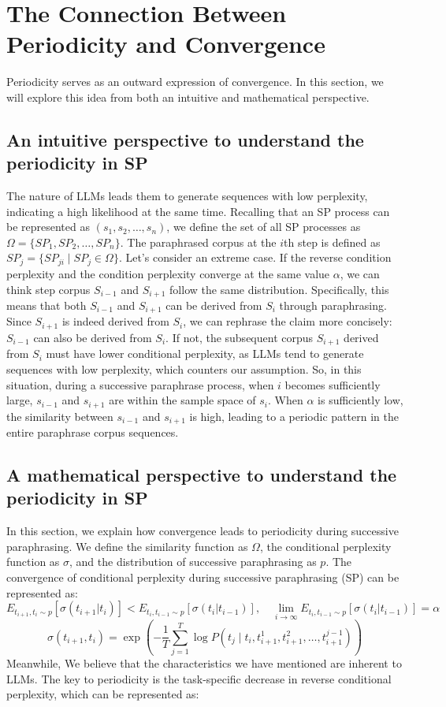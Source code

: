 \section{The Connection Between Periodicity and Convergence}
Periodicity serves as an outward expression of convergence.
In this section, we will explore this idea from both an intuitive and mathematical perspective.
\label{Convergences2Periodicity}
\subsection{An intuitive perspective to understand the periodicity in SP}
The nature of LLMs leads them to generate sequences with low perplexity, indicating a high likelihood at the same time.
Recalling that an SP process can be represented as \((s_1, s_2, \dots, s_n)\), we define the set of all SP processes as \(\Omega = \{SP_1, SP_2, \dots, SP_n\}\). The paraphrased corpus at the \(i\)th step is defined as \(SP_j = \{SP_{ji} \mid SP_j \in \Omega\}\).
Let's consider an extreme case.
If the reverse condition perplexity and the condition perplexity converge at the same value \(\alpha\), we can think step corpus \(S_{i-1}\) and \(S_{i+1}\) follow the same distribution.
Specifically, this means that both \(S_{i-1}\) and \(S_{i+1}\) can be derived from \(S_i\) through paraphrasing. 
Since \(S_{i+1}\) is indeed derived from \(S_i\), we can rephrase the claim more concisely: \(S_{i-1}\) can also be derived from \(S_i\). 
If not, the subsequent corpus \(S_{i+1}\) derived from \(S_i\) must have lower conditional perplexity, as LLMs tend to generate sequences with low perplexity, which counters our assumption.
So, in this situation, during a successive paraphrase process, when \(i\) becomes sufficiently large, \(s_{i-1}\) and \(s_{i+1}\) are within the sample space of \(s_i\).
When \(\alpha\) is sufficiently low, the similarity between \(s_{i-1}\) and \(s_{i+1}\) is high, leading to a periodic pattern in the entire paraphrase corpus sequences.

\subsection{A mathematical perspective to understand the periodicity in SP}

In this section, we explain how convergence leads to periodicity during successive paraphrasing. We define the similarity function as \(\Omega\), the conditional perplexity function as \(\sigma\), and the distribution of successive paraphrasing as \(p\). The convergence of conditional perplexity during successive paraphrasing (SP) can be represented as:
\[
E_{t_{i+1}, t_{i} \sim p}[\sigma(t_{i+1}|t_{i})] < E_{t_{i}, t_{i-1} \sim p}[\sigma(t_{i}|t_{i-1})], \quad \lim_{i \to \infty} E_{t_{i}, t_{i-1} \sim p}[\sigma(t_{i}|t_{i-1})] = \alpha
\]
\[
\sigma(t_{i+1}, t_{i}) = \exp \left( -\frac{1}{T} \sum_{j=1}^{T} \log P(t_j \mid t_i, t_{i+1}^1, t_{i+1}^2, \ldots, t_{i+1}^{j-1}) \right)
\]
Meanwhile, We believe that the characteristics we have mentioned are inherent to LLMs. The key to periodicity is the task-specific decrease in reverse conditional perplexity, which can be represented as:

